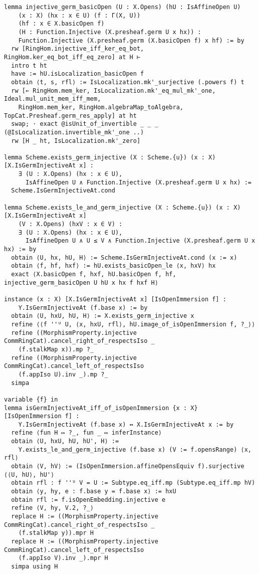 \documentclass{article}
\begin{document}
\begin{lstlisting}[language=Lean, caption={SpreadingOut.lean}]
lemma injective_germ_basicOpen (U : X.Opens) (hU : IsAffineOpen U)
    (x : X) (hx : x ∈ U) (f : Γ(X, U))
    (hf : x ∈ X.basicOpen f)
    (H : Function.Injective (X.presheaf.germ U x hx)) :
    Function.Injective (X.presheaf.germ (X.basicOpen f) x hf) := by
  rw [RingHom.injective_iff_ker_eq_bot, RingHom.ker_eq_bot_iff_eq_zero] at H ⊢
  intro t ht
  have := hU.isLocalization_basicOpen f
  obtain ⟨t, s, rfl⟩ := IsLocalization.mk'_surjective (.powers f) t
  rw [← RingHom.mem_ker, IsLocalization.mk'_eq_mul_mk'_one, Ideal.mul_unit_mem_iff_mem,
    RingHom.mem_ker, RingHom.algebraMap_toAlgebra, TopCat.Presheaf.germ_res_apply] at ht
  swap; · exact @isUnit_of_invertible _ _ _ (@IsLocalization.invertible_mk'_one ..)
  rw [H _ ht, IsLocalization.mk'_zero]

lemma Scheme.exists_germ_injective (X : Scheme.{u}) (x : X) [X.IsGermInjectiveAt x] :
    ∃ (U : X.Opens) (hx : x ∈ U),
      IsAffineOpen U ∧ Function.Injective (X.presheaf.germ U x hx) :=
  Scheme.IsGermInjectiveAt.cond

lemma Scheme.exists_le_and_germ_injective (X : Scheme.{u}) (x : X) [X.IsGermInjectiveAt x]
    (V : X.Opens) (hxV : x ∈ V) :
    ∃ (U : X.Opens) (hx : x ∈ U),
      IsAffineOpen U ∧ U ≤ V ∧ Function.Injective (X.presheaf.germ U x hx) := by
  obtain ⟨U, hx, hU, H⟩ := Scheme.IsGermInjectiveAt.cond (x := x)
  obtain ⟨f, hf, hxf⟩ := hU.exists_basicOpen_le ⟨x, hxV⟩ hx
  exact ⟨X.basicOpen f, hxf, hU.basicOpen f, hf, injective_germ_basicOpen U hU x hx f hxf H⟩

instance (x : X) [X.IsGermInjectiveAt x] [IsOpenImmersion f] :
    Y.IsGermInjectiveAt (f.base x) := by
  obtain ⟨U, hxU, hU, H⟩ := X.exists_germ_injective x
  refine ⟨⟨f ''ᵁ U, ⟨x, hxU, rfl⟩, hU.image_of_isOpenImmersion f, ?_⟩⟩
  refine ((MorphismProperty.injective CommRingCat).cancel_right_of_respectsIso _
    (f.stalkMap x)).mp ?_
  refine ((MorphismProperty.injective CommRingCat).cancel_left_of_respectsIso
    (f.appIso U).inv _).mp ?_
  simpa

variable {f} in
lemma isGermInjectiveAt_iff_of_isOpenImmersion {x : X} [IsOpenImmersion f] :
    Y.IsGermInjectiveAt (f.base x) ↔ X.IsGermInjectiveAt x := by
  refine ⟨fun H ↦ ?_, fun _ ↦ inferInstance⟩
  obtain ⟨U, hxU, hU, hU', H⟩ :=
    Y.exists_le_and_germ_injective (f.base x) (V := f.opensRange) ⟨x, rfl⟩
  obtain ⟨V, hV⟩ := (IsOpenImmersion.affineOpensEquiv f).surjective ⟨⟨U, hU⟩, hU'⟩
  obtain rfl : f ''ᵁ V = U := Subtype.eq_iff.mp (Subtype.eq_iff.mp hV)
  obtain ⟨y, hy, e : f.base y = f.base x⟩ := hxU
  obtain rfl := f.isOpenEmbedding.injective e
  refine ⟨V, hy, V.2, ?_⟩
  replace H := ((MorphismProperty.injective CommRingCat).cancel_right_of_respectsIso _
    (f.stalkMap y)).mpr H
  replace H := ((MorphismProperty.injective CommRingCat).cancel_left_of_respectsIso
    (f.appIso V).inv _).mpr H
  simpa using H


\end{lstlisting}
\end{document}
